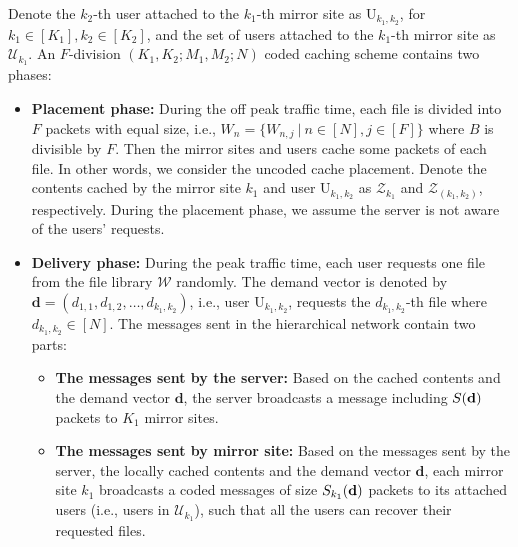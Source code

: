\documentclass[onecolumn,10pt]{IEEEtran}
\theoremstyle{mythm}
\begin{document}
Denote the $k_2$-th user attached to the $k_1$-th mirror site as $\text{U}_{k_1,k_2}$, for  $k_1\in[K_1], k_2\in [K_2]$, and the set of users attached to the $k_1$-th mirror site as $\mathcal{U}_{k_1}$.  An $F$-division $(K_1,K_2;M_1,M_2;N)$ coded caching scheme contains two phases:
 \begin{itemize}
\item {\bf Placement phase:} During the off peak traffic time, each file is divided into $F$ packets with equal size, i.e., $W_{n}=\{W_{n,j}\ |\ n\in [N], j\in [F]\}$ where $B$ is divisible by $F$. Then the mirror sites and users cache some packets of each file. In other words, we consider the uncoded cache placement. Denote the contents cached by the   mirror site $k_1$ and user $\text{U}_{k_1,k_2}$ as $\mathcal{Z}_{k_1}$ and $\mathcal{Z}_{(k_1,k_2)}$, respectively. During the placement phase, we assume the server is not aware of the users' requests.


\item {\bf Delivery phase:} During the peak traffic time, each user requests one file from the file library $\mathcal{W}$ randomly. The  demand vector is denoted by $\mathbf{d} = (d_{1,1}, d_{1,2},\ldots,d_{k_1,k_2})$, i.e., user $\text{U}_{k_1,k_2}$,   requests the $d_{k_1,k_2}$-th file where $d_{k_1,k_2}\in [N]$. The messages sent in the hierarchical network contain two parts:


    \begin{itemize}
    \item \textbf{The messages sent by the server:} Based on the cached contents and the demand vector $\mathbf{d}$, the server broadcasts a message including ${S}({\bf d})$ packets   to $K_1$ mirror sites. %
    \item \textbf{The messages sent by mirror site:} Based on the messages sent by the server, the locally cached contents and the demand vector $\mathbf{d}$, each mirror site $k_1$ broadcasts a   coded messages of size $S_{k_1}({\bf d})$ packets to its attached users (i.e., users in $\mathcal{U}_{k_1}$), such that all the  users can recover their requested files.%


\end{itemize}
\end{itemize}
\end{document}
